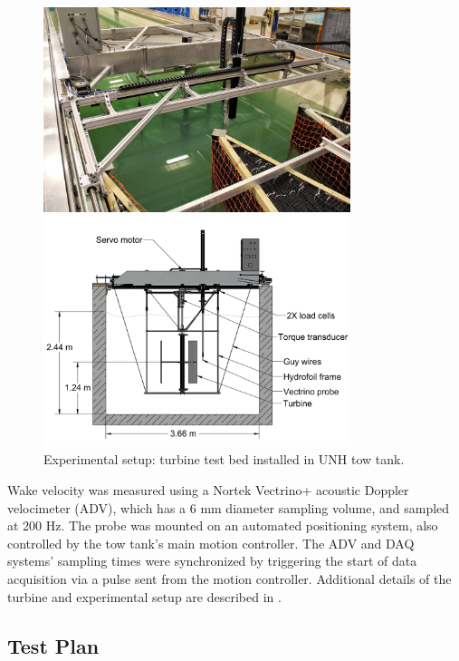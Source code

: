 \documentclass[energies,article,accept,moreauthors,pdftex,12pt,a4paper]{mdpi}
\begin{document}
\begin{figure}[ht!]
    \centering

    \includegraphics[width=0.8\textwidth]{figures/exp-setup-photo}
    
    \includegraphics[width=0.8\textwidth]{figures/exp_setup_drawing}
    
    \caption{Experimental setup: turbine test bed installed in UNH tow tank.}
    
    \label{fig:exp-setup}
\end{figure}

Wake velocity was measured using a Nortek Vectrino+ acoustic Doppler velocimeter
(ADV), which has a 6 mm diameter sampling volume, and sampled at 200 Hz. The
probe was mounted on an automated positioning system, also controlled by the tow
tank's main motion controller. The ADV and DAQ systems' sampling times were
synchronized by triggering the start of data acquisition via a pulse sent from
the motion controller. Additional details of the turbine and experimental setup
are described in \cite{Bachant2015-JoT}.


\subsection{Test Plan}
\end{document}
